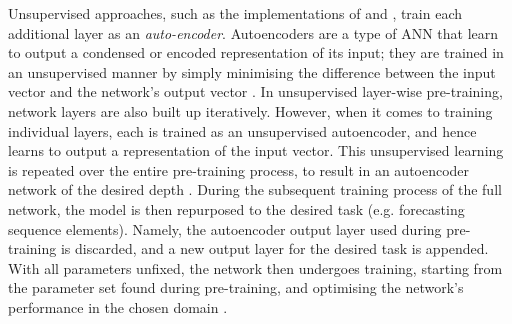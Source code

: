 \documentclass[a4paper, 11pt]{report}
\begin{document}
    Unsupervised approaches, such as the implementations of \citet{xu-2018} and \citet{sagheer-2019}, train each additional layer as an \emph{auto-encoder}. Autoencoders are a type of ANN that learn to output a condensed or encoded representation of its input; they are trained in an unsupervised manner by simply minimising the difference between the input vector and the network's output vector \citep{pinaya-2019}. In unsupervised layer-wise pre-training, network layers are also built up iteratively. However, when it comes to training individual layers, each is trained as an unsupervised autoencoder, and hence learns to output a representation of the input vector. This unsupervised learning is repeated over the entire pre-training process, to result in an autoencoder network of the desired depth \citep{sagheer-2019}. During the subsequent training process of the full network, the model is then repurposed to the desired task (e.g. forecasting sequence elements). Namely, the autoencoder output layer used during pre-training is discarded, and a new output layer for the desired task is appended. With all parameters unfixed, the network then undergoes training, starting from the parameter set found during pre-training, and optimising the network's performance in the chosen domain \citep{sagheer-2019}.
\end{document}
